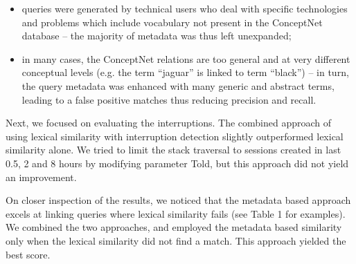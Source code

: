 \documentclass{acm_proc_article-sp} %
\begin{document}
\begin{itemize} 
	\item queries were generated by technical users who deal
	with specific technologies and problems which include
	vocabulary not present in the ConceptNet database –
	the majority of metadata was thus left unexpanded;
	\item in many cases, the ConceptNet relations are too general
	and at very different conceptual levels (e.g. the
	term “jaguar” is linked to term “black”) – in turn, the
	query metadata was enhanced with many generic and
	abstract terms, leading to a false positive matches thus
	reducing precision and recall.
\end{itemize}


\begin{table}[ht!]
	\centering
	\caption{Examples of diﬃcult search sessions from a real query log}
	\label{my-label2}
\end{table}


Next, we focused on evaluating the interruptions. The combined
approach of using lexical similarity with interruption
detection slightly outperformed lexical similarity alone. We
tried to limit the stack traversal to sessions created in last
0.5, 2 and 8 hours by modifying parameter Told, but this
approach did not yield an improvement.

On closer inspection of the results, we noticed that the metadata
based approach excels at linking queries where lexical
similarity fails (see Table 1 for examples). We combined the
two approaches, and employed the metadata based similarity
only when the lexical similarity did not find a match.
This approach yielded the best score.
\end{document}
